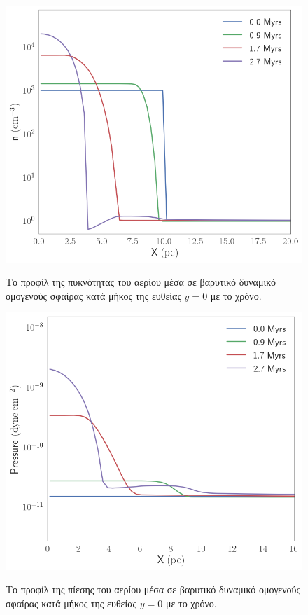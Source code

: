 \documentclass[article,a4paper,11.2pt]{memoir}
\numberwithin{equation}{subsection}
\begin{document}
\begin{figure}[h]
	\begin{adjustwidth}{-5cm}{-0cm}
	\centering
	\includegraphics[width=1\linewidth]{DataImages/NoCoolGRHOprofile}
	\caption{Το προφίλ της πυκνότητας του αερίου μέσα σε βαρυτικό δυναμικό ομογενούς σφαίρας κατά μήκος της ευθείας $y=0$ με το χρόνο.}
	\label{fig:nocoolgrhoprofile}
	\includegraphics[width=1\linewidth]{DataImages/NoCoolGPRSprofile}
	\caption{Το προφίλ της πίεσης του αερίου μέσα σε βαρυτικό δυναμικό ομογενούς σφαίρας κατά μήκος της ευθείας $y=0$ με το χρόνο.}
	\label{fig:nocoolgprsprofile}
\end{adjustwidth}
\end{figure}
\end{document}
